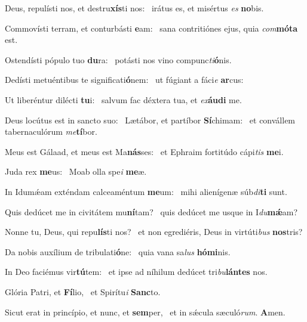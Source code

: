 \item Deus, repulísti nos, et destru\textbf{xís}ti nos:~\psstar{} irátus es, et misértus \textit{es} \textbf{no}bis.

\item Commovísti terram, et conturbásti \textbf{e}am:~\psstar{} sana contritiónes ejus, quia \textit{com}\textbf{mó}\textbf{ta} est.

\item Ostendísti pópulo tuo \textbf{du}ra:~\psstar{} potásti nos vino compunc\textit{ti}\textbf{ó}nis.

\item Dedísti metuéntibus te significati\textbf{ó}nem:~\psstar{} ut fúgiant a fáci\textit{e} \textbf{ar}cus:

\item Ut liberéntur dilécti \textbf{tu}i:~\psstar{} salvum fac déxtera tua, et \textit{ex}\textbf{áu}\textbf{di} me.

\item Deus locútus est in sancto suo:~\pscross{} Lætábor, et partíbor \textbf{Sí}chimam:~\psstar{} et convállem tabernaculórum \textit{me}\textbf{tí}bor.

\item Meus est Gálaad, et meus est Ma\textbf{nás}ses:~\psstar{} et Ephraim fortitúdo cápi\textit{tis} \textbf{me}i.

\item Juda rex \textbf{me}us:~\psstar{} Moab olla spe\textit{i} \textbf{me}æ.

\item In Idumǽam exténdam calceaméntum \textbf{me}um:~\psstar{} mihi alienígenæ súb\textit{di}\textbf{ti} sunt.

\item Quis dedúcet me in civitátem mu\textbf{ní}tam?~\psstar{} quis dedúcet me usque in I\textit{du}\textbf{mǽ}am?

\item Nonne tu, Deus, qui repu\textbf{lís}ti nos?~\psstar{} et non egrediéris, Deus in virtúti\textit{bus} \textbf{nos}tris?

\item Da nobis auxílium de tribulati\textbf{ó}ne:~\psstar{} quia vana sa\textit{lus} \textbf{hó}\textbf{mi}nis.

\item In Deo faciémus vir\textbf{tú}tem:~\psstar{} et ipse ad níhilum dedúcet tri\textit{bu}\textbf{lán}\textbf{tes} nos.

\item Glória Patri, et \textbf{Fí}lio,~\psstar{} et Spirítu\textit{i} \textbf{Sanc}to.

\item Sicut erat in princípio, et nunc, et \textbf{sem}per,~\psstar{} et in sǽcula sæculó\textit{rum}. \textbf{A}men.
